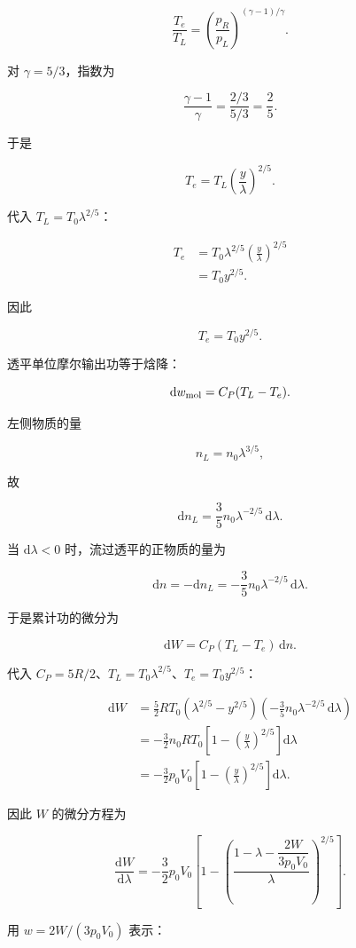 \documentclass[12pt,a4paper,UTF8]{ctexart}
\begin{document}
\[
\frac{T_e}{T_L}
=\left(\frac{p_R}{p_L}\right)^{(\gamma-1)/\gamma}.
\]

对 \(\gamma=5/3\)，指数为

\[
\frac{\gamma-1}{\gamma}
=\frac{2/3}{5/3}
=\frac25.
\]

于是

\[
T_e=T_L\left(\frac y\lambda\right)^{2/5}.
\]

代入 \(T_L=T_0\lambda^{2/5}\)：

\[
\begin{aligned}
T_e
&=T_0\lambda^{2/5}
\left(\frac y\lambda\right)^{2/5}\\
&=T_0y^{2/5}.
\end{aligned}
\]

因此

\[\boxed{T_e=T_0y^{2/5}}.\]

透平单位摩尔输出功等于焓降：

\[\mathrm{d}w_{\rm mol}=C_P(T_L-T_e).\]

左侧物质的量

\[n_L=n_0\lambda^{3/5},\]

故

\[
\mathrm{d}n_L=\frac35n_0\lambda^{-2/5}\,\mathrm{d}\lambda.
\]

当 \(\mathrm{d}\lambda<0\) 时，流过透平的正物质的量为

\[
\mathrm{d}n=-\mathrm{d}n_L
=-\frac35n_0\lambda^{-2/5}\,\mathrm{d}\lambda.
\]

于是累计功的微分为

\[
\mathrm{d}W=C_P(T_L-T_e)\,\mathrm{d}n.
\]

代入 \(C_P=5R/2\)、\(T_L=T_0\lambda^{2/5}\)、\(T_e=T_0y^{2/5}\)：

\[
\begin{aligned}
\mathrm{d}W
&=\frac52R T_0
\left(\lambda^{2/5}-y^{2/5}\right)
\left(-\frac35n_0\lambda^{-2/5}\,\mathrm{d}\lambda\right)\\
&=-\frac32n_0RT_0
\left[1-\left(\frac y\lambda\right)^{2/5}\right]\mathrm{d}\lambda\\
&=-\frac32p_0V_0
\left[1-\left(\frac y\lambda\right)^{2/5}\right]\mathrm{d}\lambda.
\end{aligned}
\]

因此 \(W\) 的微分方程为

\[
\boxed{
\frac{\mathrm{d}W}{\mathrm{d}\lambda}
=-\frac32p_0V_0
\left[
1-\left(
\frac{1-\lambda-\dfrac{2W}{3p_0V_0}}{\lambda}
\right)^{2/5}
\right]
}.
\]

用 \(w=2W/(3p_0V_0)\) 表示：
\end{document}
